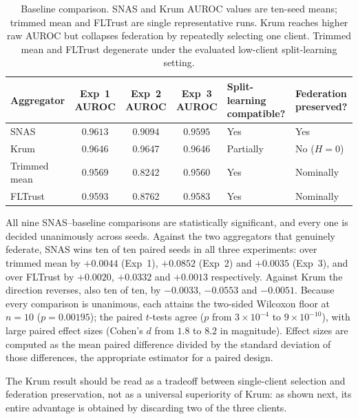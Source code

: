 \documentclass[pdflatex,sn-mathphys-num]{sn-jnl}
\begin{document}
\begin{table}[t]
\caption{Baseline comparison. SNAS and Krum AUROC values are ten-seed means; trimmed mean and FLTrust are single representative runs. Krum reaches higher raw AUROC but collapses federation by repeatedly selecting one client. Trimmed mean and FLTrust degenerate under the evaluated low-client split-learning setting.}
\label{tab:baselines}
\centering
\begin{tabularx}{\textwidth}{@{}lccc>{\raggedright\arraybackslash}X>{\raggedright\arraybackslash}X@{}}
\toprule
Aggregator & Exp~1 AUROC & Exp~2 AUROC & Exp~3 AUROC & Split-learning compatible? & Federation preserved? \\
\midrule
SNAS & $\mathbf{0.9613}$ & $\mathbf{0.9094}$ & $\mathbf{0.9595}$ & Yes & Yes \\
Krum & 0.9646 & 0.9647 & 0.9646 & Partially & No ($H=0$) \\
Trimmed mean & 0.9569 & 0.8242 & 0.9560 & Yes & Nominally \\
FLTrust & 0.9593 & 0.8762 & 0.9583 & Yes & Nominally \\
\bottomrule
\end{tabularx}
\end{table}

All nine SNAS--baseline comparisons are statistically significant, and every one is decided unanimously across seeds. Against the two aggregators that genuinely federate, SNAS wins ten of ten paired seeds in all three experiments: over trimmed mean by $+0.0044$ (Exp~1), $+0.0852$ (Exp~2) and $+0.0035$ (Exp~3), and over FLTrust by $+0.0020$, $+0.0332$ and $+0.0013$ respectively. Against Krum the direction reverses, also ten of ten, by $-0.0033$, $-0.0553$ and $-0.0051$. Because every comparison is unanimous, each attains the two-sided Wilcoxon floor at $n=10$ ($p=0.00195$); the paired $t$-tests agree ($p$ from $3\times10^{-4}$ to $9\times10^{-10}$), with large paired effect sizes (Cohen's $d$ from $1.8$ to $8.2$ in magnitude). Effect sizes are computed as the mean paired difference divided by the standard deviation of those differences, the appropriate estimator for a paired design.

The Krum result should be read as a tradeoff between single-client selection and federation preservation, not as a universal superiority of Krum: as shown next, its entire advantage is obtained by discarding two of the three clients.
\end{document}
